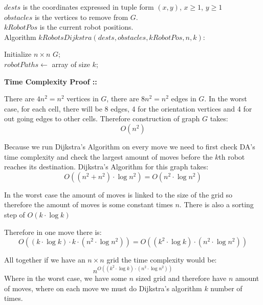 \documentclass[11pt]{article}
\begin{document}
\begin{enumerate}[(a)]
$dests$ is the coordinates expressed in tuple form $(x, y)$, $x\ge 1$, $y\ge 1$ \\
$obstacles$ is the vertices to remove from $G$. \\
$kRobotPos$ is the current robot positions. \\
Algorithm $kRobotsDijkstra(dests, obstacles, kRobotPos, n, k)$:
\begin{algorithm}
    Initialize $n\times n$ $G$; \\
    $robotPaths \gets$ array of size $k$; \\




\end{algorithm}

\pagebreak

\textbf{Time Complexity Proof ::}

There are $4n^2 = n^2$ vertices in $G$, there are $8n^2 = n^2$ edges in $G$.
In the worst case, for each cell, there will be 8 edges, 4 for the orientation
vertices and 4 for out going edges to other cells. Therefore construction of graph $G$
takes: $$O(n^2)$$

Because we run Dijkstra's Algorithm on every move we need to first check DA's time
complexity and check the largest amount of moves before the $k$th robot reaches its destination. Dijkstra's Algorithm for this graph takes:
$$O((n^2 + n^2)\cdot\log n^2) = O(n^2\cdot\log n^2)$$

In the worst case the amount of moves is linked to the size of the grid so therefore
the amount of moves is some constant times $n$. There is also a sorting step of
$O(k\cdot\log k)$

Therefore in one move there is: $$O((k\cdot\log k)\cdot k\cdot (n^2\cdot\log n^2))
= O((k^2\cdot \log k)\cdot (n^2\cdot\log n^2))$$

All together if we have an $n\times n$ grid the time complexity would be:
$$n^{O((k^2\cdot \log k)\cdot (n^2\cdot\log n^2))}$$
Where in the worst case, we have some $n$ sized grid and therefore have $n$ amount
of moves, where on each move we must do Dijkstra's algorithm $k$ number of times.

\end{enumerate}
\end{document}
